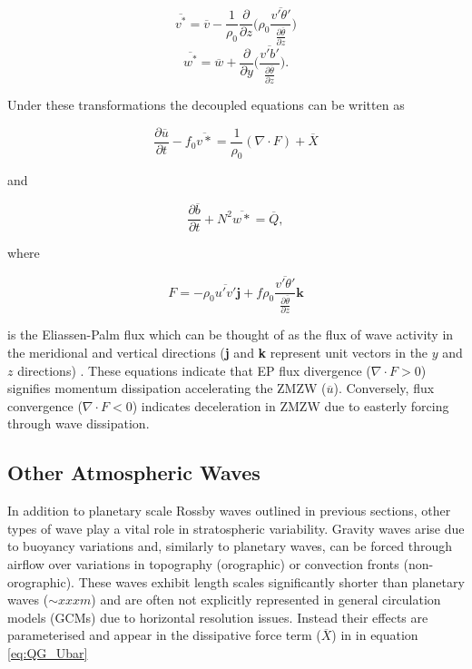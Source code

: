 \begin{equation} \label{eq:V*}
\overline{v^*} = \overline{v} - \frac{1}{\rho_0}\frac{\partial}{\partial z} \bigg(\rho_0 \frac{\overline{v'\theta'}}{\frac{\partial{\overline{\theta}}}{\partial{z}}}\bigg)
\end{equation}\break
\begin{equation} \label{eq:W*}
\overline{w^*} = \overline{w} + \frac{\partial}{\partial y} \bigg( \frac{\overline{v'b'}}{\frac{\partial{\overline{\theta}}}{\partial{z}}}\bigg).
\end{equation}

Under these transformations the decoupled equations can be written as

\begin{equation} \label{eq:decoupled_U}
\frac{\partial \overline{u}}{\partial t} - f_0 \overline{v*} = \frac{1}{\rho_0} (\nabla \cdot F) + \overline{X}
\end{equation}

and

\begin{equation} \label{eq:decoupled_b}
\frac{\partial \overline{b}}{\partial t} + N^2 \overline{w*} = \overline{Q},
\end{equation}

where

\begin{equation} \label{eq:EP_flux}
F = -\rho_0 \overline{u'v'}\textbf{j} + f\rho_0\frac{\overline{v'\theta'}}{\frac{\partial{\overline{\theta}}}{\partial{z}}} \textbf{k}
\end{equation}

\noindent is the Eliassen-Palm flux which can be thought of as the flux of wave activity in the meridional and vertical directions (\textbf{j} and \textbf{k} represent unit vectors in the $y$ and $z$ directions) \citep{andrewsPlanetary1976}. These equations indicate that EP flux divergence ($\nabla \cdot F > 0$) signifies momentum dissipation accelerating the ZMZW ($\overline{u}$). Conversely, flux convergence ($\nabla \cdot F < 0$) indicates deceleration in ZMZW due to easterly forcing through wave dissipation.

\subsection{Other Atmospheric Waves} \label{sec:other_waves}
In addition to planetary scale Rossby waves outlined in previous sections, other types of wave play a vital role in stratospheric variability. Gravity waves arise due to buoyancy variations and, similarly to planetary waves, can be forced through airflow over variations in topography (orographic) or convection fronts (non-orographic). These waves exhibit length scales significantly shorter than planetary waves ($\sim xxxm$) and are often not explicitly represented in general circulation models (GCMs) due to horizontal resolution issues. Instead their effects are parameterised and appear in the dissipative force term ($\overline{X}$) in in equation \ref{eq:QG_Ubar}

